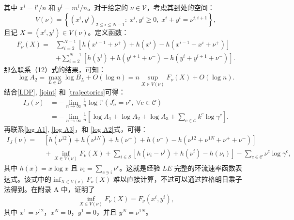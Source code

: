 其中 $x^i = l^i/n$ 和 $y^i = m^i/n$。对于给定的 $\nu \in \mathcal{V}$，考虑其到处的空间：
\begin{equation*}
    V(\nu) = \left\{\left(x^{i},y^{i}\right)_{2\le i\le N-1}:\;x^i,y^i\geq0,\;x^{i}+y^{i}=\nu^{i,i+1}\right\},
\end{equation*}
且记 $X = (x^i, y^i) \in V(\nu)$。定义函数：
\begin{equation}\label{formula:F}
    \begin{split}
    F_{\nu}(X)
    =&\sum_{i=2}^{N-1}\left[ h\left(x^{i-1}+\nu^+\right) + h\left(x^{i}\right) - h\left(x^{i-1}+x^{i}+\nu^+\right) \right] \\
    &+ \sum_{i=2}^{N-1} \left[h\left(y^{i}\right) + h\left(y^{i+1} +\nu^-\right)-h\left(y^{i} +y^{i+1} +\nu^-\right)\right].
    \end{split}
\end{equation}
那么联系（12）式的结果，可知：
\begin{equation}\label{log A2}
    \log A_2 = \max_{L\in D}\log B_L+O(\log n)
    = n\sup_{X\in V(\nu)}F_{\nu}(X)+O(\log n).
\end{equation}
结合\eqref{LDP}, \eqref{joint} 和 \eqref{trajectories}可得：
\begin{equation*}
    \begin{split}
    I_J(\nu) &= -\lim_{n\to\infty}\frac{1}{n}\log\mathbb{P}\left(J^c_n=\nu^c,\;\forall c\in\mathcal{C}\right)\\
    &= -\lim_{n\to\infty}\frac{1}{n}\left[\log A_1+\log A_2+\log A_3+\sum_{c\in\mathcal{C}}k^c\log\gamma^c\right].
    \end{split}
\end{equation*}
再联系\eqref{log A1}, \eqref{log A3}，和 \eqref{log A2}式，可得：
\begin{equation}\label{ratefunction}
    \begin{split}
    I_J(\nu) =&\; \left[h\left(\nu^{12}\right)+h\left(\nu^{1N}\right)
    +h\left(\nu^+\right)+h\left(\nu^-\right)-h\left(\nu^{12}+\nu^{1N}+\nu^++\nu^-\right)\right] \\
    &\;+\inf_{X\in V(\nu)}F_{\nu}(X)+\sum_{i\in S}\left[ h\left(\nu_i-\nu^i\right)+h\left(\nu^i\right)
    -h\left(\nu_i\right)\right]-\sum_{c\in\mathcal{C}}\nu^c\log\gamma^c,
    \end{split}
\end{equation}
其中 $h(x) = x \log x$ 且 $\nu_i=\sum_{c\ni i}\nu^c$。这就是经验 $LE$ 完整的环流速率函数表达式。该式中的$\inf_{X\in V(\nu)}F_{\nu}(X)$ 难以直接计算，不过可以通过拉格朗日乘子法得到。在附录 A 中，证明了
\begin{equation*}
    \inf_{X\in V(\nu)}F_{\nu}(X) = F_{\nu}(x^i,y^i),
\end{equation*}
其中 $x^1=\nu^{12}$，$x^N=0$，$y^1=0$，并且 $y^N=\nu^{1N}$。

